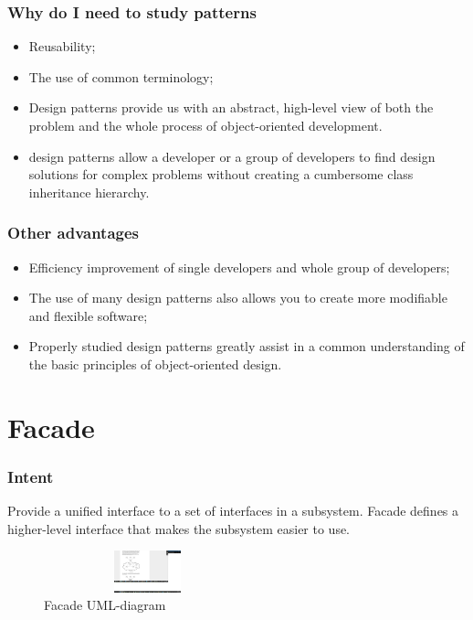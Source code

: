 \documentclass[10pt,xcolor={usenames,dvipsnames}]{beamer}
\begin{document}
\begin{frame}[fragile]
	\frametitle{Why do I need to study patterns}
	\begin{itemize}
		\item Reusability;
		\item The use of common terminology;
		\item Design patterns provide us with an abstract, high-level view of
		both the problem and the whole process of object-oriented development.
	\item design patterns allow a developer or a group of developers to find design solutions for complex problems without creating a cumbersome class inheritance hierarchy.
	\end{itemize}
\end{frame}

\begin{frame}[fragile]
	\frametitle{Other advantages}
	\begin{itemize}
		\item Efficiency improvement of single developers and whole group of developers;
		\item The use of many design patterns also allows you to create more modifiable and flexible software;
		\item Properly studied design patterns greatly assist in a common understanding of the basic principles of object-oriented design. 
	\end{itemize}
\end{frame}

\section{Facade}
\begin{frame}[fragile]
	\frametitle{Intent}
	\begin{exampleblock}{}
	Provide a unified interface to a set of interfaces in a subsystem. Facade defines a
	higher-level interface that makes the subsystem easier to use.
	\end{exampleblock}

		\begin{figure}
			\includegraphics[height=1.2cm,width=6cm]{facade.png}
			\caption{Facade UML-diagram}
		\end{figure}

\end{frame}
\end{document}
